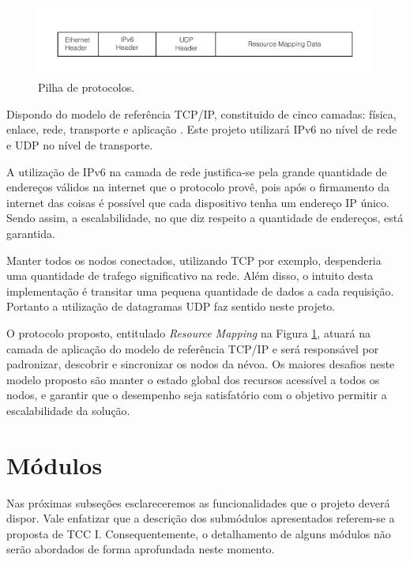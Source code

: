 \begin{figure}[htb!]
    \centering\includegraphics[width=.75\textwidth]{fig2.pdf}
    \caption%
    {\label{fig:fig2} Pilha de protocolos.}
\end{figure}

Dispondo do modelo de referência TCP/IP, constituido de cinco camadas: física, enlace, rede, transporte e aplicação \cite{tanenbaum2011redes}.
Este projeto utilizará IPv6 no nível de rede e UDP no nível de transporte.

A utilização de IPv6 na camada de rede justifica-se pela grande quantidade de endereços válidos na internet que o protocolo provê, pois após o firmamento da internet das coisas é possível que cada dispositivo tenha um endereço IP único.
Sendo assim, a escalabilidade, no que diz respeito a quantidade de endereços, está garantida.

Manter todos os nodos conectados, utilizando TCP por exemplo, despenderia uma quantidade de trafego significativo na rede. Além disso, o intuito desta implementação é transitar uma pequena quantidade de dados a cada requisição.
Portanto a utilização de datagramas UDP faz sentido neste projeto.

O protocolo proposto, entitulado \textit{Resource Mapping} na Figura \ref{fig:fig2}, atuará na camada de aplicação do modelo de referência TCP/IP \cite{tanenbaum2011redes} e será responsável por padronizar, descobrir e sincronizar os nodos da névoa.
Os maiores desafios neste modelo proposto são manter o estado global dos recursos acessível a todos os nodos, e garantir que o desempenho seja satisfatório com o objetivo permitir a escalabilidade da solução.



\section{Módulos}

Nas próximas subseções esclareceremos as funcionalidades que o projeto deverá dispor.
Vale enfatizar que a descrição dos submódulos apresentados referem-se a proposta de TCC I.
Consequentemente, o detalhamento de alguns módulos não serão abordados de forma aprofundada neste momento.


